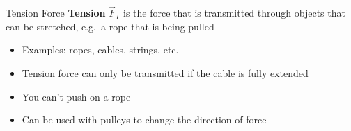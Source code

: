 \documentclass[12pt,compress,aspectratio=169]{beamer}
\begin{document}
%






\begin{frame}{Tension Force}
  \textbf{Tension} $\vec F_T$ is the force that is transmitted through objects
  that can be stretched, e.g.\ a rope that is being pulled
  \begin{center}
  \end{center}
  \begin{itemize}
  \item Examples: ropes, cables, strings, etc.
  \item Tension force can only be transmitted if the cable is fully extended
  \item You can't push on a rope
  \item Can be used with pulleys to change the direction of force
  \end{itemize}
\end{frame}
\end{document}
